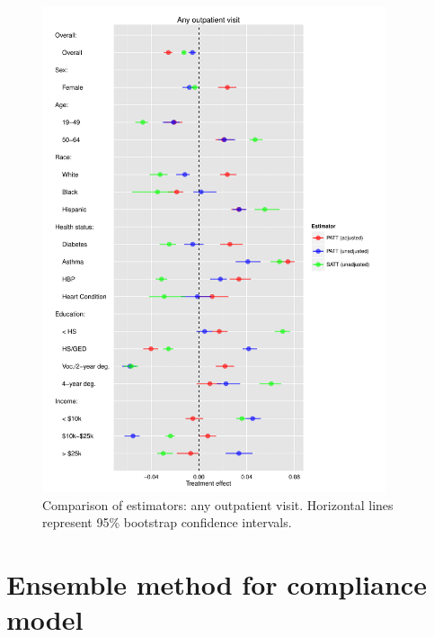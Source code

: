 \documentclass[12pt]{article}
\begin{document}
\begin{appendices}
\begin{figure}[htbp]
\begin{center}
\includegraphics[width = 0.9\textwidth]{any-out-plot.pdf}
    \caption{Comparison of estimators: any outpatient visit. Horizontal lines represent 95\% bootstrap confidence intervals.}
    \label{fig:any-out-plot}
\end{center}
\end{figure}

\section{Ensemble method for compliance model}


\end{appendices}
\end{document}
